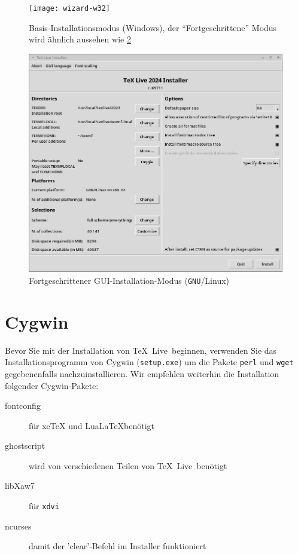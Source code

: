 \documentclass[12pt,ngerman,a4paper,fullparskip]{report}
\newcommand{\TL}{\TeX\ Live\xspace}
\newcommand{\acro}[1]{\texttt{#1}}
\newcommand{\code}[1]{\texttt{#1}}
\newcommand{\filename}[1]{\texttt{#1}}
\providecommand*{\GNU}{\acro{GNU}\xspace}
\providecommand*{\XeTeX}{xe\TeX\xspace}
\begin{document}
\begin{figure}[tb]
\texttt{[image: wizard-w32]}
\caption{Basis-Installationsmodus (Windows), der \enquote{Fortgeschrittene} Modus wird ähnlich aussehen wie 
\ref{fig:advanced-lnx}}\label{fig:wizard-w32}
\end{figure}


\begin{figure}[tb]
\includegraphics[width={\linewidth}]{advanced-lnx}
\caption{Fortgeschrittener GUI-Installation-Modus (\GNU/Linux)}\label{fig:advanced-lnx}
\end{figure}

\section{Cygwin}\label{sec:cygwin}

Bevor Sie mit der Installation von \TL\ beginnen, verwenden Sie das
Installationsprogramm von Cygwin (\filename{setup.exe}) um die Pakete
\filename{perl} und \filename{wget} gegebenenfalls nachzuinstallieren.
Wir empfehlen weiterhin die Installation folgender Cygwin-Pakete:

\begin{description}
\item[fontconfig] für \XeTeX und Lua\LaTeX benötigt
\item[ghostscript] wird von verschiedenen Teilen von \TL\ benötigt
\item[libXaw7] für \code{xdvi}
\item[ncurses] damit der 'clear'-Befehl im Installer funktioniert
\end{description}
\end{document}
